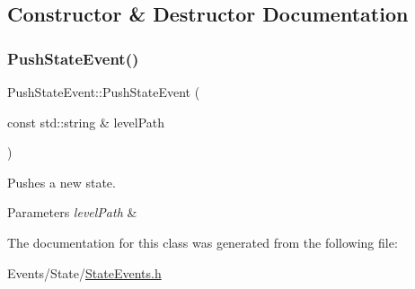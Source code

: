 \subsection{Constructor \& Destructor Documentation}
\mbox{\label{classPushStateEvent_a34800c81fa17762cc05bdcb7c6346170}} 
\subsubsection{\texorpdfstring{Push\+State\+Event()}{PushStateEvent()}}
{\footnotesize\ttfamily Push\+State\+Event\+::\+Push\+State\+Event (\begin{DoxyParamCaption}\item[{const std\+::string \&}]{level\+Path }\end{DoxyParamCaption})\hspace{0.3cm}{\ttfamily [inline]}}



Pushes a new state. 


\begin{DoxyParams}{Parameters}
{\em level\+Path} & \\
\hline
\end{DoxyParams}


The documentation for this class was generated from the following file\+:\begin{DoxyCompactItemize}
\item 
Events/\+State/\hyperlink{StateEvents_8h}{State\+Events.\+h}\end{DoxyCompactItemize}
